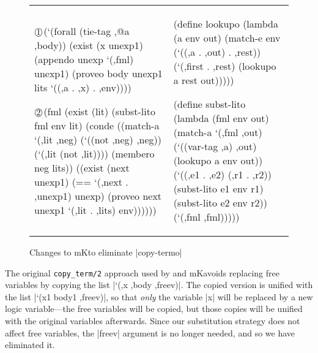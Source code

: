 \begin{figure}[H]

\noindent \begin{tabular}{l l}
\begin{minipage}{2.5in}
\small
\begin{schemedisplay}
$\onet$(`(forall (tie-tag ,@a ,body))
   (exist (x unexp1)
     (appendo unexp `(,fml) unexp1)
     (proveo body unexp1 lits
             `((,a . ,x) . ,env))))

$\twot$(fml
  (exist (lit)
    (subst-lito fml env lit)
    (conde
      ((match-a `(,lit ,neg)
         (`((not ,neg) ,neg))
         (`(,lit (not ,lit))))
       (membero neg lits))
      ((exist (next unexp1)
         (== `(,next . ,unexp1) unexp)
         (proveo next unexp1 `(,lit . ,lits) 
                 env))))))
\end{schemedisplay}

\vspace{.1cm}
\end{minipage}
&


\begin{minipage}{1.2in}
\small
\begin{schemedisplay}
(define lookupo
  (lambda (a env out)
    (match-e env
      (`((,a . ,out) . ,rest))
      (`(,first . ,rest)
       (lookupo a rest out)))))
\end{schemedisplay}

\begin{schemedisplay}
(define subst-lito
  (lambda (fml env out)
    (match-a `(,fml ,out)
      (`((var-tag ,a) ,out)
       (lookupo a env out))
      (`((,e1 . ,e2) (,r1 . ,r2))
       (subst-lito e1 env r1)
       (subst-lito e2 env r2))
      (`(,fml ,fml)))))
\end{schemedisplay}

\end{minipage}

\end{tabular}

\caption{Changes to mK\leantapsp to eliminate \protect\scheme|copy-termo|
  \label{fig:changes}}
\end{figure}

The original \mbox{\texttt{copy\_term/2}} approach used by \leantapsp and
mK\leantapsp avoids replacing free variables by copying the list
\scheme|`(,x ,body ,freev)|. The copied version is unified with the list
\scheme|`(x1 body1 ,freev)|, so that \textit{only} the variable
\scheme|x| will be replaced by a new logic variable---the free
variables will be copied, but those copies will be unified with the
original variables afterwards. Since our substitution strategy does
not affect free variables, the \scheme|freev| argument is no longer
needed, and so we have eliminated it.


